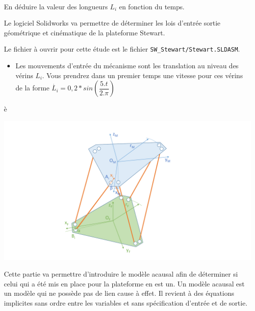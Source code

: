 
~\

En déduire la valeur des longueurs $L_i$ en fonction du temps.

\newpage


Le logiciel Solidworks va permettre de déterminer les lois d'entrée sortie géométrique et cinématique de la plateforme Stewart.

Le fichier à ouvrir pour cette étude est le fichier \verb?SW_Stewart/Stewart.SLDASM?.

\begin{itemize}
 \item Les mouvements d'entrée du mécanisme sont les translation au niveau des vérins $L_i$. Vous prendrez dans un premier temps une vitesse pour ces vérins de la forme $\dot{L_i}=0,2*sin(\dfrac{5.t}{2.\pi})$
\end{itemize}
è
\begin{center}
 \includegraphics[width=0.8\linewidth]{img/Stewart_cin1}
\end{center}



\newpage


Cette partie va permettre d'introduire le modèle \og acausal \fg afin de déterminer si celui qui a été mis en place pour la plateforme en est un. Un modèle \og acausal \fg est un modèle qui ne possède pas de lien cause à effet. Il revient à des équations implicites sans ordre entre les variables et sans spécification d'entrée et de sortie.

